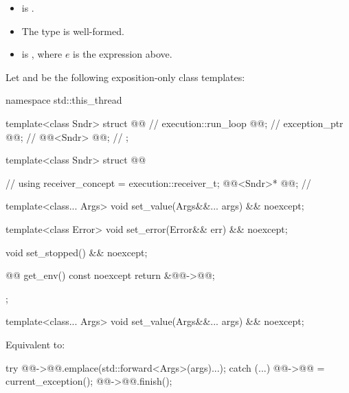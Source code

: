 \pnum
\mandates
\begin{itemize}
\item
{} is .
\item
The type  is well-formed.
\item
{}
is , where $e$ is the  expression above.
\end{itemize}

\pnum
Let  and 
be the following exposition-only class templates:
\begin{codeblock}
namespace std::this_thread {
  template<class Sndr>
  struct @@ {                                      // \expos
    execution::run_loop @@;                                   // \expos
    exception_ptr @@;                                        // \expos
    @@<Sndr> @@;                         // \expos
  };

  template<class Sndr>
  struct @@ {                                   // \expos
    using receiver_concept = execution::receiver_t;
    @@<Sndr>* @@;                               // \expos

    template<class... Args>
    void set_value(Args&&... args) && noexcept;

    template<class Error>
    void set_error(Error&& err) && noexcept;

    void set_stopped() && noexcept;

    @@ get_env() const noexcept { return {&@@->@@}; }
  };
}
\end{codeblock}

\begin{itemdecl}
template<class... Args>
void set_value(Args&&... args) && noexcept;
\end{itemdecl}

\begin{itemdescr}
\pnum
\effects
Equivalent to:
\begin{codeblock}
try {
  @@->@@.emplace(std::forward<Args>(args)...);
} catch (...) {
  @@->@@ = current_exception();
}
@@->@@.finish();
\end{codeblock}
\end{itemdescr}


